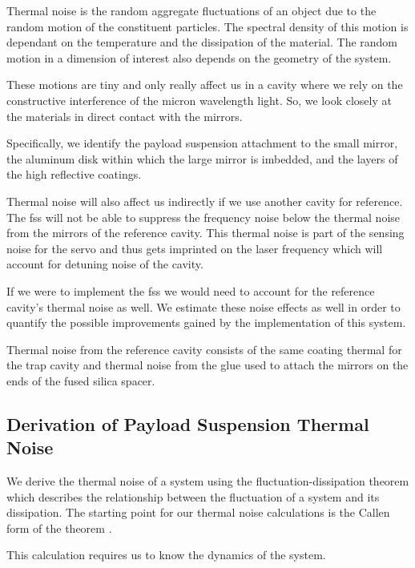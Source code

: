 Thermal noise is the random aggregate fluctuations of an object due to the
random motion of the constituent particles.
The spectral density of this motion is dependant on the temperature and the
dissipation of the material.
The random motion in a dimension of interest also depends on the geometry of
the system.

These motions are tiny and only really affect us in a cavity where we rely on
the constructive interference of the micron wavelength light.
So, we look closely at the materials in direct contact with the mirrors.

Specifically, we identify the payload suspension attachment to the small
mirror, the aluminum disk within which the large mirror is imbedded, and the
layers of the high reflective coatings.

Thermal noise will also affect us indirectly if we use another cavity for
reference.
The \ac{fss} will not be able to suppress the frequency noise below the
thermal noise from the mirrors of the reference cavity.
This thermal noise is part of the sensing noise for the servo and thus gets
imprinted on the laser frequency which will account for detuning noise of
the cavity.

If we were to implement the \ac{fss} we would need to account for the
reference cavity's thermal noise as well.
We estimate these noise effects as well in order to quantify the possible
improvements gained by the implementation of this system.

Thermal noise from the reference cavity consists of the same coating thermal
for the trap cavity and thermal noise from the glue used to attach the
mirrors on the ends of the fused silica spacer.

\subsection{Derivation of Payload Suspension Thermal Noise}

We derive the thermal noise of a system using the fluctuation-dissipation
theorem which describes the relationship between the fluctuation of a system
and its dissipation.
The starting point for our thermal noise calculations
is the Callen form of the theorem \cite{Saulson,Callen}.

This calculation requires us to know the dynamics of the system.

